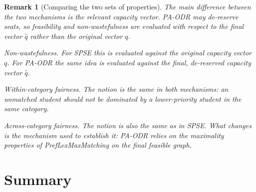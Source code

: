 \documentclass[10pt]{article}
\newtheorem{example}{Example}
\newtheorem{remark}{Remark}
\newcommand{\1}{\mathbf{1}}
\begin{document}
\begin{remark}[Comparing the two sets of properties]
\label{rem:spse-vs-paodr}
The main difference between the two mechanisms is the relevant capacity vector. PA-ODR may de-reserve seats, so feasibility and non-wastefulness are evaluated with respect to the final vector $\hat q$ rather than the original vector $q$.

\emph{Non-wastefulness.} For SPSE this is evaluated against the original capacity vector $q$. For PA-ODR the same idea is evaluated against the final, de-reserved capacity vector $\hat q$.

\emph{Within-category fairness.} The notion is the same in both mechanisms: an unmatched student should not be dominated by a lower-priority student in the same category.

\emph{Across-category fairness.} The notion is also the same as in SPSE. What changes is the mechanism used to establish it: PA-ODR relies on the maximality properties of PrefLexMaxMatching on the final feasible graph.
\end{remark}





\section{Summary}
\end{document}
